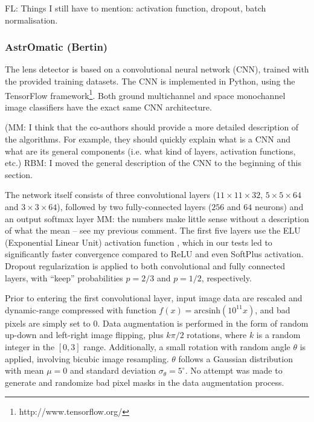 \documentclass[useAMS,usenatbib]{mnras}
\newcommand{\fl}[1]{{\color{magenta}FL: #1}}
\begin{document}
\fl{Things I still have to mention: activation function, dropout, batch normalisation}.



\subsubsection{AstrOmatic (Bertin)}

The lens detector is based on a convolutional neural network (CNN), trained with the provided training datasets. The CNN is implemented in Python, using the TensorFlow framework\footnote{http://www.tensorflow.org/}. Both ground multichannel and space monochannel image classifiers have the exact same CNN architecture.

{\color{red} (MM: I think that the co-authors should provide a more detailed description of the algorithms. For example, they should quickly explain what is a CNN and what are its general components (i.e. what kind of layers, activation functions, etc.)} 
{\color{blue} RBM: I moved the general description of the CNN to the beginning of this section.}

The network itself consists of three convolutional layers ($11\times 11\times 32$, $5\times 5 \times 64$ and $3\times 3\times 64$), followed by two fully-connected layers ($256$ and $64$ neurons) and an output softmax layer {\color{red} MM: the numbers make little sense without a description of what the mean -- see my previous comment}. The first five layers use the ELU (Exponential Linear Unit) activation function \citep{2015arXiv151107289C}, which in our tests led to significantly faster convergence compared to ReLU and even SoftPlus activation. Dropout regularization \citep{2012arXiv1207.0580H,JMLR:v15:srivastava14a} is applied to both convolutional and fully connected layers, with ``keep'' probabilities $p=2/3$ and $p=1/2$, respectively.

Prior to entering the first convolutional layer, input image data are rescaled and dynamic-range compressed with function $f(x) =
\mathrm{arcsinh} (10^{11} x)$, and bad pixels are simply set to 0.
Data augmentation is performed in the form of random up-down and left-right image flipping, plus $k\pi/2$ rotations, where $k$ is a random integer in the $[0,3]$ range. Additionally, a small rotation with random angle $\theta$ is applied, involving bicubic image resampling. $\theta$ follows a Gaussian distribution with mean $\mu=0$ and standard deviation $\sigma_{\theta}=5^{\circ}$. No attempt was made to generate and randomize bad pixel masks in the data augmentation process.
\end{document}
